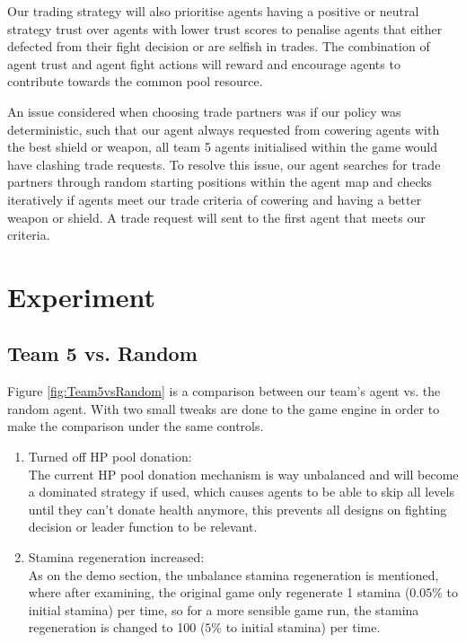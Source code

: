 Our trading strategy will also prioritise agents having a positive or neutral strategy trust over agents with lower trust scores to penalise agents that either defected from their fight decision or are selfish in trades. The combination of agent trust and agent fight actions will reward and encourage agents to contribute towards the common pool resource.

An issue considered when choosing trade partners was if our policy was deterministic, such that our agent always requested from cowering agents with the best shield or weapon, all team 5 agents initialised within the game would have clashing trade requests. To resolve this issue, our agent searches for trade partners through random starting positions within the agent map and checks iteratively if agents meet our trade criteria of cowering and having a better weapon or shield. A trade request will sent to the first agent that meets our criteria.

\section{Experiment}

\subsection{Team 5 vs. Random}
Figure \ref{fig:Team5vsRandom} is a comparison between our team's agent vs. the random agent. With two small tweaks are done to the game engine in order to make the comparison under the same controls.

\begin{enumerate}
    \item Turned off HP pool donation: \\
          The current HP pool donation mechanism is way unbalanced and will become a dominated strategy if used, which causes agents to be able to skip all levels until they can't donate health anymore, this prevents all designs on fighting decision or leader function to be relevant.
    \item Stamina regeneration increased: \\
          As on the demo section, the unbalance stamina regeneration is mentioned, where after examining, the original game only regenerate 1 stamina ($0.05\%$ to initial stamina) per time, so for a more sensible game run, the stamina regeneration is changed to 100 ($5\%$ to initial stamina) per time.
\end{enumerate}

